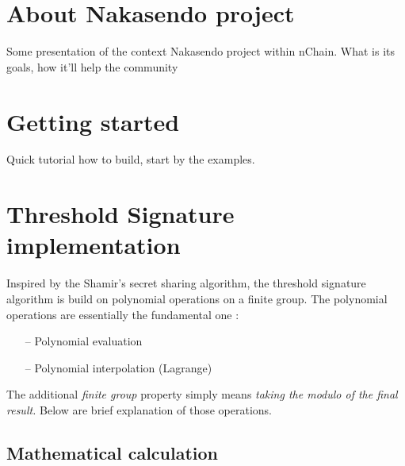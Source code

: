 \documentclass[a4paper,10pt]{article}
\begin{document}
\tableofcontents
\newpage

\newpage
\section{About Nakasendo project}
Some presentation of the context Nakasendo project within nChain. What is its goals, how it'll help the community

\section{Getting started}
Quick tutorial how to build, start by the examples.

\section{Threshold Signature implementation}
Inspired by the Shamir's secret sharing algorithm, the threshold signature algorithm is build on polynomial operations on a finite group. The polynomial operations are essentially the fundamental one :
\begin{itemize}
	\item[--] Polynomial evaluation
	\item[--] Polynomial interpolation (Lagrange)
\end{itemize}
The additional \textit{finite group} property simply means \textit{taking the modulo of the final result.} Below are brief explanation of those operations.
\subsection{Mathematical calculation}%
\end{document}
